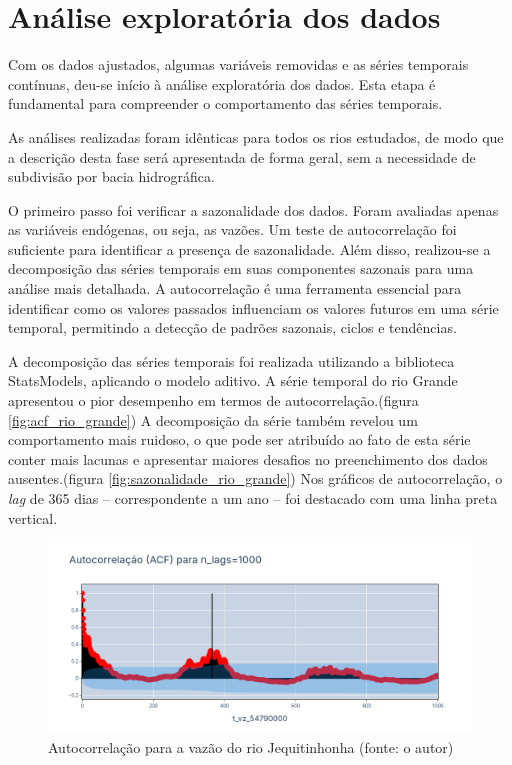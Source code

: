 \section{Análise exploratória dos dados}

Com os dados ajustados, algumas variáveis removidas e as séries temporais contínuas, deu-se início à análise exploratória dos dados. Esta etapa é fundamental para compreender o comportamento das séries temporais.

As análises realizadas foram idênticas para todos os rios estudados, de modo que a descrição desta fase será apresentada de forma geral, sem a necessidade de subdivisão por bacia hidrográfica.

O primeiro passo foi verificar a sazonalidade dos dados. Foram avaliadas apenas as variáveis endógenas, ou seja, as vazões. Um teste de autocorrelação foi suficiente para identificar a presença de sazonalidade. Além disso, realizou-se a decomposição das séries temporais em suas componentes sazonais para uma análise mais detalhada. A autocorrelação é uma ferramenta essencial para identificar como os valores passados influenciam os valores futuros em uma série temporal, permitindo a detecção de padrões sazonais, ciclos e tendências.

A decomposição das séries temporais foi realizada utilizando a biblioteca StatsModels, aplicando o modelo aditivo.\cite{seabold2010statsmodels} A série temporal do rio Grande apresentou o pior desempenho em termos de autocorrelação.(figura \ref{fig:acf_rio_grande}) A decomposição da série também revelou um comportamento mais ruidoso, o que pode ser atribuído ao fato de esta série conter mais lacunas e apresentar maiores desafios no preenchimento dos dados ausentes.(figura \ref{fig:sazonalidade_rio_grande}) Nos gráficos de autocorrelação, o \textit{lag} de 365 dias – correspondente a um ano – foi destacado com uma linha preta vertical.

\begin{figure}[!h]
\centering
\includegraphics[scale=0.33]{Figuras/acf_jequitinhonha.png}
\caption{Autocorrelação para a vazão do rio Jequitinhonha (fonte: o autor)}
\label{fig:acf_jequitinhonha}
\end{figure}

